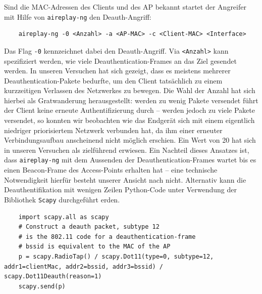 Sind die MAC-Adressen des Clients und des AP bekannt startet der Angreifer mit Hilfe von \texttt{aireplay-ng} den Deauth-Angriff: 
\begin{Verbatim}
	aireplay-ng -0 <Anzahl> -a <AP-MAC> -c <Client-MAC> <Interface>
\end{Verbatim}
Das Flag \texttt{-0} kennzeichnet dabei den Deauth-Angriff.
Via \texttt{<Anzahl>} kann spezifiziert werden, wie viele Deauthentication-Frames an das Ziel gesendet werden.
In unseren Versuchen hat sich gezeigt, dass es meistens mehrerer Deauthentication-Pakete bedurfte, um den Client tatsächlich zu einem kurzzeitigen Verlassen des Netzwerkes zu bewegen. Die Wahl der Anzahl hat sich hierbei als Gratwanderung herausgestellt: werden zu wenig Pakete versendet führt der Client keine erneute Authentifizierung durch -- werden jedoch zu viele Pakete versendet, so konnten wir beobachten wie das Endgerät sich mit einem eigentlich niedriger priorisiertem Netzwerk verbunden hat, da ihm einer erneuter Verbindungsaufbau anscheinend nicht möglich erschien. Ein Wert von 20 hat sich in unseren Versuchen als zielführend erwiesen.
Ein Nachteil dieses Ansatzes ist, dass \texttt{aireplay-ng} mit dem Aussenden der Deauthentication-Frames wartet bis es einen Beacon-Frame des Access-Points erhalten hat -- eine technische Notwendigkeit hierfür besteht unserer Ansicht nach nicht.
Alternativ kann die Deauthentifikation mit wenigen Zeilen Python-Code unter Verwendung der Bibliothek \texttt{Scapy} durchgeführt erden.

\begin{verbatim}
	import scapy.all as scapy
	# Construct a deauth packet, subtype 12 
	# is the 802.11 code for a deauthentication-frame
	# bssid is equivalent to the MAC of the AP
	p = scapy.RadioTap() / scapy.Dot11(type=0, subtype=12, addr1=clientMac, addr2=bssid, addr3=bssid) / scapy.Dot11Deauth(reason=1)
	scapy.send(p)
\end{verbatim}


